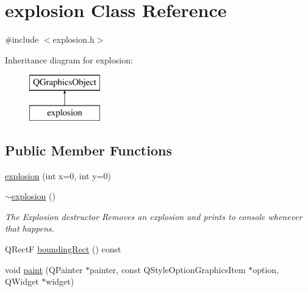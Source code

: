 \hypertarget{classexplosion}{\section{explosion Class Reference}
\label{classexplosion}
}


{\ttfamily \#include $<$explosion.\-h$>$}

Inheritance diagram for explosion\-:\begin{figure}[H]
\begin{center}
\leavevmode
\includegraphics[height=2.000000cm]{classexplosion}
\end{center}
\end{figure}
\subsection*{Public Member Functions}
\begin{DoxyCompactItemize}
\item 
\hyperlink{classexplosion_ac3aabcbf16f356fcd3bdc8588cf36cf1}{explosion} (int x=0, int y=0)
\item 
\hyperlink{classexplosion_a3fc08d8c702d74ee3164825c975f8230}{$\sim$explosion} ()
\begin{DoxyCompactList}\small\item\em The Explosion destructor Removes an explosion and prints to console whenever that happens. \end{DoxyCompactList}\item 
Q\-Rect\-F \hyperlink{classexplosion_adc8680178e9e7d4e388d8850a2c03125}{bounding\-Rect} () const 
\item 
void \hyperlink{classexplosion_a401d7dbebfc4a92bcc408172df67c782}{paint} (Q\-Painter $\ast$painter, const Q\-Style\-Option\-Graphics\-Item $\ast$option, Q\-Widget $\ast$widget)
\end{DoxyCompactItemize}


